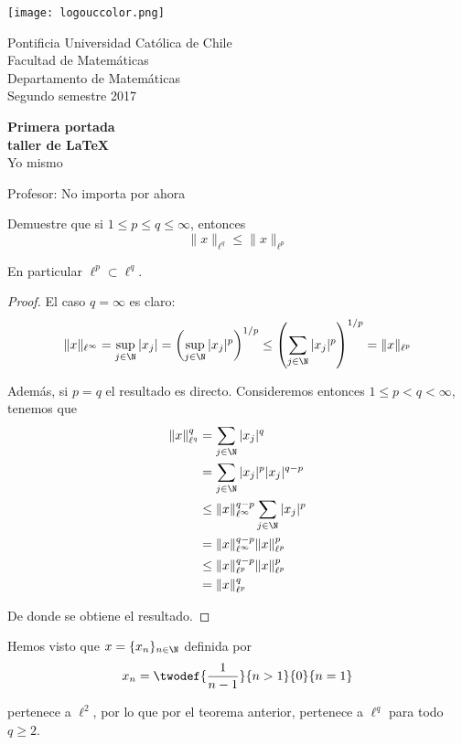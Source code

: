 \documentclass{article}
\begin{document}
\begin{titlepage}
	\begin{minipage}{2.5cm}
		\texttt{[image: logouccolor.png]}
	\end{minipage}
	\begin{minipage}{13 cm}
		\begin{flushleft}
   			\noindent\large{\sc
				Pontificia Universidad Católica de Chile \\ 
		     		Facultad de Matemáticas \\ 
		     		Departamento de Matemáticas \\ 
				Segundo semestre 2017
		     	}
		\end{flushleft}
	\end{minipage}
	
\begin{center}
	\vspace*{\fill}
		\Huge\textbf{Primera portada}	\\
		\Huge\textbf{taller de \LaTeX}	\\
		\LARGE{Yo mismo} \\
	\vspace*{\fill}
		
	\vfill
		
	\Large{Profesor: No importa por ahora}
\end{center}
\end{titlepage}

\begin{teo} Demuestre que si $1 \leq p \leq q \leq \infty$, entonces
	$$\|x\|_{\ell^{q}} \leq \|x\|_{\ell^{p}}$$
	
En particular $\ell^{p} \subset \ell^{q}$.
\end{teo}

\begin{proof} El caso $q = \infty$ es claro:
	$$\|x\|_{\ell^{\infty}} 
		= 	\sup_{j \in \N} |x_{j}|
		= 	\left(\sup_{j \in \N} |x_{j}|^{p}\right)^{1/p} 
		\leq	\left(\sum_{j \in \N} |x_{j}|^{p}\right)^{1/p} = \|x\|_{\ell^{p}}
	$$

Además, si $p = q$ el resultado es directo. Consideremos entonces $1 \leq p < q < \infty$, tenemos que
	\begin{align*}
		\|x\|_{\ell^{q}}^{q}
			&=		\sum_{j \in \N} |x_{j}|^{q}	\\
			&=		\sum_{j \in \N} |x_{j}|^{p} |x_{j}|^{q-p}	\\
			&\leq		\|x\|^{q-p}_{\ell^{\infty}} \sum_{j \in \N} |x_{j}|^{p}	\\
			&=		\|x\|^{q-p}_{\ell^{\infty}} \|x\|_{\ell^{p}}^{p}	\\
			&\leq		\|x\|^{q-p}_{\ell^{p}} \|x\|_{\ell^{p}}^{p}	\\
			&=		\|x\|_{\ell^{p}}^{q}		 
	\end{align*}

De donde se obtiene el resultado.
\end{proof}                                          

\begin{obs} Hemos visto que $x = \{x_{n}\}_{n \in \N}$ definida por
	$$x_{n} = \twodef	{\frac{1}{n-1}}{n > 1}
					{0}{n = 1}$$

pertenece a $\ell^{2}$, por lo que por el teorema anterior, pertenece a $\ell^{q}$ para todo $q \geq 2$.
\end{obs}
\end{document}
